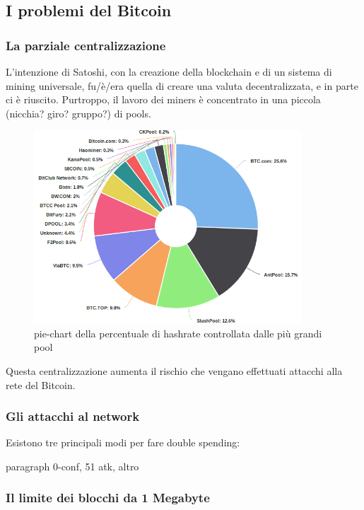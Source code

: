 \documentclass {article}
\begin{document}
\subsection {I problemi del Bitcoin}


\subsubsection {La parziale centralizzazione}


L'intenzione di Satoshi, con la creazione della blockchain e di un sistema di mining universale, fu/è/era quella di creare una valuta decentralizzata, e in parte ci è riuscito.
Purtroppo, il lavoro dei miners è concentrato in una piccola (nicchia? giro? gruppo?) di pools.

\vspace {0.5cm}
\begin{figure}[htb!]
\includegraphics [width = 10cm] {pools.png}
\centering
\caption {pie-chart della percentuale di hashrate controllata dalle più grandi pool}
\end{figure}

Questa centralizzazione aumenta il rischio che vengano effettuati attacchi alla rete del Bitcoin.


\subsubsection {Gli attacchi al network}


Esistono tre principali modi per fare double spending:

paragraph 0-conf, 51 atk, altro


\subsubsection {Il limite dei blocchi da 1 Megabyte}
\end{document}

